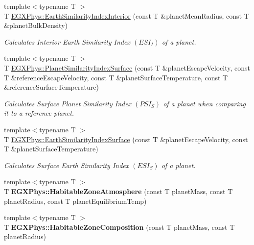 \begin{DoxyCompactItemize}
{\footnotesize template$<$typename T $>$ }\\T \mbox{\hyperlink{group___e_g_x_phys-_planet_criteria_ga699bcc2f17b8855eaa856595d8032f61}{E\+G\+X\+Phys\+::\+Earth\+Similarity\+Index\+Interior}} (const T \&planet\+Mean\+Radius, const T \&planet\+Bulk\+Density)
\begin{DoxyCompactList}\small\item\em Calculates Interior Earth Similarity Index $(ESI_I)$ of a planet. \end{DoxyCompactList}\item 
{\footnotesize template$<$typename T $>$ }\\T \mbox{\hyperlink{group___e_g_x_phys-_planet_criteria_gae0c7dce2779d66b0560ca388a34ddc39}{E\+G\+X\+Phys\+::\+Planet\+Similarity\+Index\+Surface}} (const T \&planet\+Escape\+Velocity, const T \&reference\+Escape\+Velocity, const T \&planet\+Surface\+Temperature, const T \&reference\+Surface\+Temperature)
\begin{DoxyCompactList}\small\item\em Calculates Surface Planet Similarity Index $(PSI_S)$ of a planet when comparing it to a reference planet. \end{DoxyCompactList}\item 
{\footnotesize template$<$typename T $>$ }\\T \mbox{\hyperlink{group___e_g_x_phys-_planet_criteria_ga1df772b0ed354ca7f7e4a7a4af072325}{E\+G\+X\+Phys\+::\+Earth\+Similarity\+Index\+Surface}} (const T \&planet\+Escape\+Velocity, const T \&planet\+Surface\+Temperature)
\begin{DoxyCompactList}\small\item\em Calculates Surface Earth Similarity Index $(ESI_S)$ of a planet. \end{DoxyCompactList}\item 
\mbox{\label{group___e_g_x_phys-_planet_criteria_ga0814237dccfe3c968b97fa6c93aeca27}} 
{\footnotesize template$<$typename T $>$ }\\T {\bfseries E\+G\+X\+Phys\+::\+Habitable\+Zone\+Atmosphere} (const T planet\+Mass, const T planet\+Radius, const T planet\+Equilibrium\+Temp)
\item 
\mbox{\label{group___e_g_x_phys-_planet_criteria_ga14ab036f8c617512236522c8e31dd072}} 
{\footnotesize template$<$typename T $>$ }\\T {\bfseries E\+G\+X\+Phys\+::\+Habitable\+Zone\+Composition} (const T planet\+Mass, const T planet\+Radius)
\end{DoxyCompactItemize}


